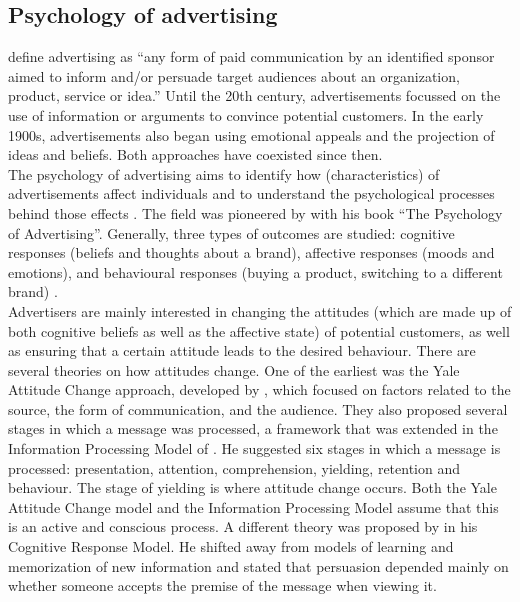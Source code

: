 \documentclass[10pt,a4paper]{article}
\begin{document}
\subsection{Psychology of advertising}
\cite{Fennis2015} define advertising as “any form of paid communication by an identified sponsor aimed to inform and/or persuade target audiences about an organization, product, service or idea.” Until the 20th century, advertisements focussed on the use of information or arguments to convince potential customers. In the early 1900s, advertisements also began using emotional appeals and the projection of ideas and beliefs. Both approaches have coexisted since then. \\

The psychology of advertising aims to identify how (characteristics) of advertisements affect individuals and to understand the psychological processes behind those effects \citep{Fennis2015}. The field was pioneered by \cite{Scott1916} with his book “The Psychology of Advertising”. Generally, three types of outcomes are studied: cognitive responses (beliefs and thoughts about a brand), affective responses (moods and emotions), and behavioural responses (buying a product, switching to a different brand) \citep{Fennis2015}. \\

Advertisers are mainly interested in changing the attitudes (which are made up of both cognitive beliefs as well as the affective state) of potential customers, as well as ensuring that a certain attitude leads to the desired behaviour. There are several theories on how attitudes change. One of the earliest was the Yale Attitude Change approach, developed by \cite{Hovland1953}, which focused on factors related to the source, the form of communication, and the audience. They also proposed several stages in which a message was processed, a framework that was extended in the Information Processing Model of \cite{McGuire1968}. He suggested six stages in which a message is processed: presentation, attention, comprehension, yielding, retention and behaviour. The stage of yielding is where attitude change occurs. Both the Yale Attitude Change model and the Information Processing Model assume that this is an active and conscious process. A different theory was proposed by \cite{Greenwald1968} in his Cognitive Response Model. He shifted away from models of learning and memorization of new information and stated that persuasion depended mainly on whether someone accepts the premise of the message when viewing it. \\
\end{document}
